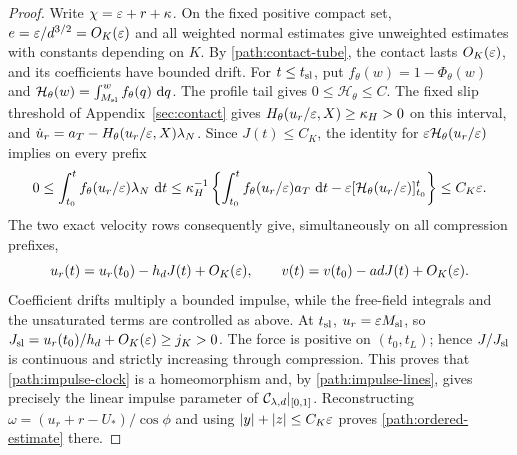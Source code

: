 \begin{proof}
Write $\chi=\varepsilon+r+\kappa$.  On the fixed positive compact set,
$e=\varepsilon/d^{3/2}=O_K(\varepsilon)$ and all weighted normal estimates
give unweighted estimates with constants depending on $K$.
By \eqref{path:contact-tube}, the contact lasts $O_K(\varepsilon)$,
and its coefficients have bounded drift.  For $t\le t_{\rm sl}$, put
$f_\theta(w)=1-\Phi_\theta(w)$ and
$\mathcal H_\theta(w)=\int_{M_{\rm sl}}^w f_\theta(q)\,\,\mathrm d q$.
The profile tail gives $0\le\mathcal H_\theta\le C$.
The fixed slip threshold of Appendix~\ref{sec:contact} gives
$H_\theta(u_r/\varepsilon,X)\ge\kappa_H>0$ on this interval, and
$\dot u_r=a_T-H_\theta(u_r/\varepsilon,X)\lambda_N$.
Since $J(t)\le C_K$,
the identity for $\varepsilon\mathcal H_\theta(u_r/\varepsilon)$ implies on
every prefix
\begin{equation}
 0\le\int_{t_0}^t f_\theta(u_r/\varepsilon)\lambda_N\,\,\mathrm d t
 \le\kappa_H^{-1}\left\{\int_{t_0}^t f_\theta(u_r/\varepsilon)a_T\,\,\mathrm d t
             -\varepsilon[\mathcal H_\theta(u_r/\varepsilon)]_{t_0}^t\right\}
 \le C_K\varepsilon.
 \label{path:tail-impulse}
\end{equation}
The two exact velocity rows consequently give, simultaneously on
all compression prefixes,
\begin{equation}
 u_r(t)=u_r(t_0)-h_dJ(t)+O_K(\varepsilon),\qquad
 v(t)=v(t_0)-adJ(t)+O_K(\varepsilon).
 \label{path:impulse-lines}
\end{equation}
Coefficient drifts multiply a bounded impulse, while the free-field
integrals and the unsaturated terms are controlled as above.  At
$t_{\rm sl}$, $u_r=\varepsilon M_{\rm sl}$, so
$J_{\rm sl}=u_r(t_0)/h_d+O_K(\varepsilon)\ge j_K>0$.
The force is positive on $(t_0,t_L)$; hence $J/J_{\rm sl}$ is continuous
and strictly increasing through compression.  This proves that
\eqref{path:impulse-clock} is a homeomorphism and, by
\eqref{path:impulse-lines}, gives precisely the linear impulse
parameter of $\mathcal C_{\lambda,d}|_{[0,1]}$.  Reconstructing
$\omega=(u_r+r-U_*)/\cos\phi$ and using
$|y|+|z|\le C_K\varepsilon$ proves \eqref{path:ordered-estimate} there.


\end{proof}
